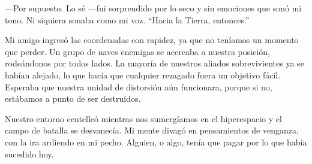 \documentclass[spanish,12pt,a4paper,oneside,titlepage]{book}
\begin{document}
    —Por supuesto. Lo sé —fui sorprendido por lo seco y sin emociones que sonó mi tono. Ni siquiera sonaba como mi voz. ``Hacia la Tierra, entonces.''

    Mi amigo ingresó las coordenadas con rapidez, ya que no teníamos un momento que perder. Un grupo de naves enemigas se acercaba a nuestra posición, rodeándonos por todos lados. La mayoría de nuestros aliados sobrevivientes ya se habían alejado, lo que hacía que cualquier rezagado fuera un objetivo fácil. Esperaba que nuestra unidad de distorsión aún funcionara, porque si no, estábamos a punto de ser destruidos.

    Nuestro entorno centelleó mientras nos sumergíamos en el hiperespacio y el campo de batalla se desvanecía. Mi mente divagó en pensamientos de venganza, con la ira ardiendo en mi pecho. Alguien, o algo, tenía que pagar por lo que había sucedido hoy.
\end{document}
